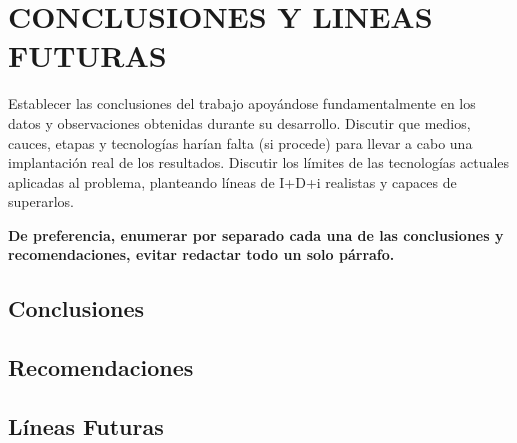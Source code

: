 \chapter{CONCLUSIONES Y LINEAS FUTURAS}
\thispagestyle{empty}

Establecer las conclusiones del trabajo apoyándose fundamentalmente en los datos y observaciones obtenidas durante su desarrollo. Discutir que medios, cauces, etapas y tecnologías harían falta (si procede) para llevar a cabo una implantación real de los resultados.
Discutir los límites de las tecnologías actuales aplicadas al problema, planteando líneas de I+D+i realistas y capaces de superarlos.

\textbf{De preferencia, enumerar por separado cada una de las conclusiones y recomendaciones, evitar redactar todo un solo párrafo.}

\section{Conclusiones}
\section{Recomendaciones}
\section{Líneas Futuras}